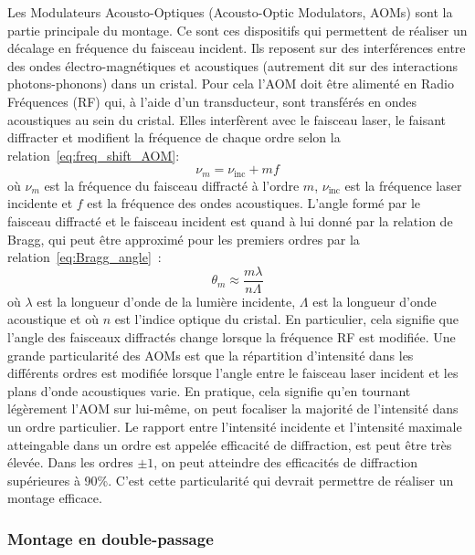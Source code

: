 \documentclass[12pt, a4paper]{article}
\begin{document}
Les Modulateurs Acousto-Optiques (Acousto-Optic Modulators, AOMs) sont la partie principale du montage. Ce sont ces dispositifs qui permettent de réaliser un décalage en fréquence du faisceau incident. Ils reposent sur des interférences entre des ondes électro-magnétiques et acoustiques (autrement dit sur des interactions photons-phonons) dans un cristal. Pour cela l'AOM doit être alimenté en Radio Fréquences (RF) qui, à l'aide d'un transducteur, sont transférés en ondes acoustiques au sein du cristal. Elles interfèrent avec le faisceau laser, le faisant diffracter et modifient la fréquence de chaque ordre selon la relation~\ref{eq:freq_shift_AOM}:
\begin{equation}\label{eq:freq_shift_AOM}
  \nu_m = \nu_\mathrm{inc} + mf
\end{equation} 
où \(\nu_m\) est la fréquence du faisceau diffracté à l'ordre \(m\), \(\nu_\mathrm{inc}\) est la fréquence laser incidente et \(f\) est la fréquence des ondes acoustiques. L'angle formé par le faisceau diffracté et le faisceau incident est quand à lui donné par la relation de Bragg, qui peut être approximé pour les premiers ordres par la relation~\ref{eq:Bragg_angle}~:
\begin{equation}\label{eq:Bragg_angle}
  \theta_m \approx \frac{m\lambda}{n\Lambda}
\end{equation}
où \(\lambda\) est la longueur d'onde de la lumière incidente, \(\Lambda\) est la longueur d'onde acoustique et où \(n\) est l'indice optique du cristal. En particulier, cela signifie que l'angle des faisceaux diffractés change lorsque la fréquence RF est modifiée. Une grande particularité des AOMs est que la répartition d'intensité dans les différents ordres est modifiée lorsque l'angle entre le faisceau laser incident et les plans d'onde acoustiques varie. En pratique, cela signifie qu'en tournant légèrement l'AOM sur lui-même, on peut focaliser la majorité de l'intensité dans un ordre particulier. Le rapport entre l'intensité incidente et l'intensité maximale atteingable dans un ordre est appelée efficacité de diffraction, est peut être très élevée. Dans les ordres \(\pm1\), on peut atteindre des efficacités de diffraction supérieures à 90\%. C'est cette particularité qui devrait permettre de réaliser un montage efficace.

\subsubsection{Montage en double-passage}\label{subsubsec:AOMDP}
\end{document}
